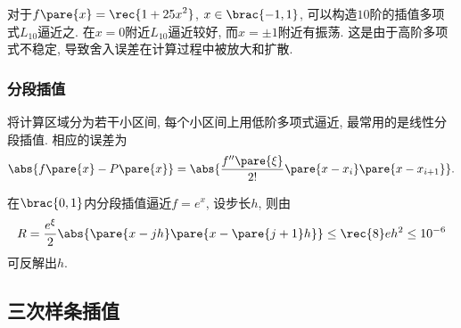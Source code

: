 \documentclass[hidelinks]{ctexart}
\begin{document}
\begin{ex}
    对于$\displaystyle f\pare{x} = \rec{1+25x^2}$, $x\in \brac{-1,1}$, 可以构造$10$阶的插值多项式$L_{10}$逼近之. 在$x=0$附近$L_{10}$逼近较好, 而$x = \pm 1$附近有振荡. 这是由于高阶多项式不稳定, 导致舍入误差在计算过程中被放大和扩散.
\end{ex}


\subsubsection{分段插值} %
\label{ssub:分段插值}

将计算区域分为若干小区间, 每个小区间上用低阶多项式逼近, 最常用的是线性分段插值. 相应的误差为
\[ \abs{f\pare{x} - P\pare{x}} = \abs{\frac{f''\pare{\xi}}{2!}\pare{x-x_i}\pare{x-x_{i+1}}}. \]
\begin{ex}
    在$\brac{0,1}$内分段插值逼近$f=e^x$, 设步长$h$, 则由
    \[ R = \frac{e^\xi}{2}\abs{\pare{x-jh}\pare{x-\pare{j+1}h}} \le \rec{8}eh^2 \le 10^{-6} \]
    可反解出$h$.
\end{ex}



\subsection{三次样条插值} %
\label{sub:三次样条插值}
\end{document}
